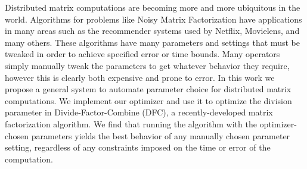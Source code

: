 Distributed matrix computations are becoming more and more ubiquitous in the world. Algorithms for problems like Noisy Matrix Factorization have applications in many areas such as the recommender systems used by Netflix, Movielens, and many others. These algorithms have many parameters and settings that must be tweaked in order to achieve specified error or time bounds. Many operators simply manually tweak the parameters to get whatever behavior they require, however this is clearly both expensive and prone to error. In this work we propose a general system to automate parameter choice for distributed matrix computations. We implement our optimizer and use it to optimize the division parameter in Divide-Factor-Combine (DFC), a recently-developed matrix factorization algorithm. We find that running the algorithm with the optimizer-chosen parameters yields the best behavior of any manually chosen parameter setting, regardless of any constraints imposed on the time or error of the computation.